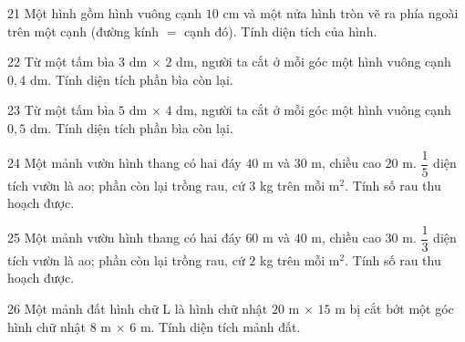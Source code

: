 \gap
\begin{probbox}{21}{\relax}
Một hình gồm hình vuông cạnh $10$ cm và một nửa hình tròn vẽ ra phía ngoài trên một cạnh (đường kính $=$ cạnh đó). Tính diện tích của hình.
\end{probbox}
\gap
\begin{probbox}{22}{\relax}
Từ một tấm bìa $3$ dm $\times$ $2$ dm, người ta cắt ở mỗi góc một hình vuông cạnh $0{,}4$ dm. Tính diện tích phần bìa còn lại.
\end{probbox}
\gap
\begin{probbox}{23}{\relax}
Từ một tấm bìa $5$ dm $\times$ $4$ dm, người ta cắt ở mỗi góc một hình vuông cạnh $0{,}5$ dm. Tính diện tích phần bìa còn lại.
\end{probbox}
\gap
\begin{probbox}{24}{\relax}
Một mảnh vườn hình thang có hai đáy $40$ m và $30$ m, chiều cao $20$ m. $\dfrac{1}{5}$ diện tích vườn là ao; phần còn lại trồng rau, cứ $3$ kg trên mỗi m$^2$. Tính số rau thu hoạch được.
\end{probbox}
\gap
\begin{probbox}{25}{\relax}
Một mảnh vườn hình thang có hai đáy $60$ m và $40$ m, chiều cao $30$ m. $\dfrac{1}{3}$ diện tích vườn là ao; phần còn lại trồng rau, cứ $2$ kg trên mỗi m$^2$. Tính số rau thu hoạch được.
\end{probbox}
\gap
\begin{probbox}{26}{\relax}
Một mảnh đất hình chữ L là hình chữ nhật $20$ m $\times$ $15$ m bị cắt bớt một góc hình chữ nhật $8$ m $\times$ $6$ m. Tính diện tích mảnh đất.
\end{probbox}
